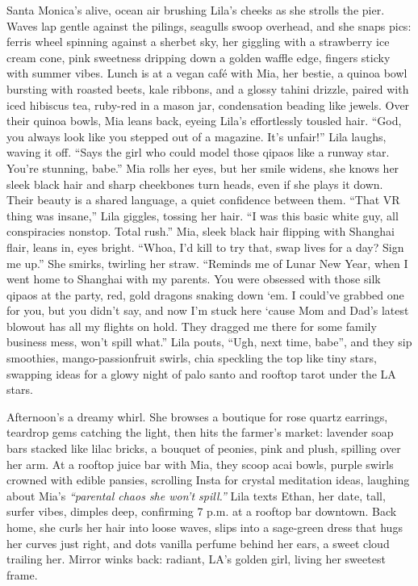 \documentclass[12pt]{article}
\begin{document}
{Santa Monica’s alive, ocean air brushing \textnormal{Lila}’s cheeks as she strolls the pier. Waves lap gentle against the pilings, seagulls swoop overhead, and she snaps pics: ferris wheel spinning against a sherbet sky, her giggling with a strawberry ice cream cone, pink sweetness dripping down a golden waffle edge, fingers sticky with summer vibes. Lunch is at a vegan café with \textnormal{Mia}, her bestie, a quinoa bowl bursting with roasted beets, kale ribbons, and a glossy tahini drizzle, paired with iced hibiscus tea, ruby-red in a mason jar, condensation beading like jewels. Over their quinoa bowls, \textnormal{Mia} leans back, eyeing \textnormal{Lila}’s effortlessly tousled hair. “God, you always look like you stepped out of a magazine. It’s unfair!” \textnormal{Lila} laughs, waving it off. “Says the girl who could model those qipaos like a runway star. You’re stunning, babe.” \textnormal{Mia} rolls her eyes, but her smile widens, she knows her sleek black hair and sharp cheekbones turn heads, even if she plays it down. Their beauty is a shared language, a quiet confidence between them. “That VR thing was insane,” \textnormal{Lila} giggles, tossing her hair. “I was this basic white guy, all conspiracies nonstop. Total rush.” \textnormal{Mia}, sleek black hair flipping with Shanghai flair, leans in, eyes bright. “Whoa, I’d kill to try that, swap lives for a day? Sign me up.” She smirks, twirling her straw. “Reminds me of Lunar New Year, when I went home to Shanghai with my parents. You were obsessed with those silk qipaos at the party, red, gold dragons snaking down ‘em. I could’ve grabbed one for you, but you didn’t say, and now I’m stuck here ‘cause Mom and Dad’s latest blowout has all my flights on hold. They dragged me there for some family business mess, won’t spill what.” \textnormal{Lila} pouts, “Ugh, next time, babe”, and they sip smoothies, mango-passionfruit swirls, chia speckling the top like tiny stars, swapping ideas for a glowy night of palo santo and rooftop tarot under the LA stars.

Afternoon’s a dreamy whirl. She browses a boutique for rose quartz earrings, teardrop gems catching the light, then hits the farmer’s market: lavender soap bars stacked like lilac bricks, a bouquet of peonies, pink and plush, spilling over her arm. At a rooftop juice bar with \textnormal{Mia}, they scoop acai bowls, purple swirls crowned with edible pansies, scrolling Insta for crystal meditation ideas, laughing about \textnormal{Mia}’s \textit{“parental chaos she won’t spill.”} \textnormal{Lila} texts \textnormal{Ethan}, her date, tall, surfer vibes, dimples deep, confirming 7 p.m. at a rooftop bar downtown. Back home, she curls her hair into loose waves, slips into a sage-green dress that hugs her curves just right, and dots vanilla perfume behind her ears, a sweet cloud trailing her. Mirror winks back: radiant, LA’s golden girl, living her sweetest frame.

}
\end{document}
